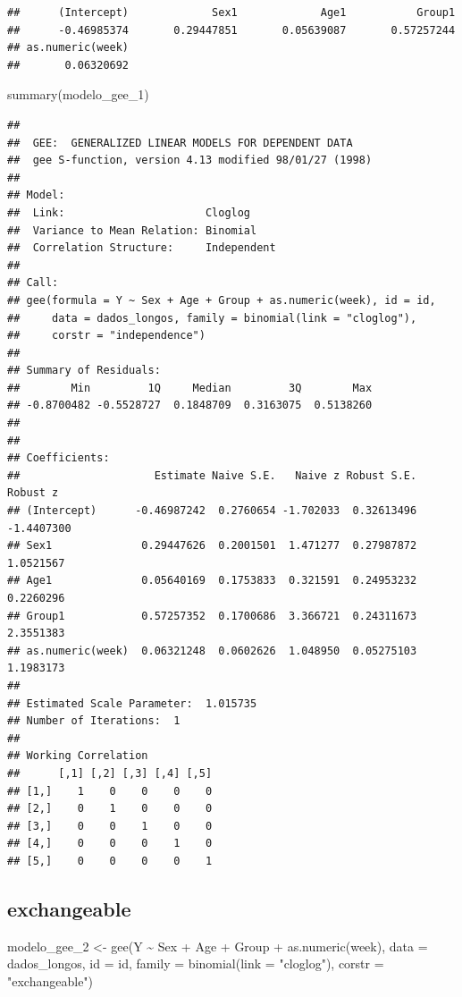\documentclass[
]{article}
\newenvironment{Shaded}{\begin{snugshade}}{\end{snugshade}}
\newcommand{\AttributeTok}[1]{\textcolor[rgb]{0.77,0.63,0.00}{#1}}
\newcommand{\FunctionTok}[1]{\textcolor[rgb]{0.00,0.00,0.00}{#1}}
\newcommand{\NormalTok}[1]{#1}
\newcommand{\OtherTok}[1]{\textcolor[rgb]{0.56,0.35,0.01}{#1}}
\newcommand{\SpecialCharTok}[1]{\textcolor[rgb]{0.00,0.00,0.00}{#1}}
\newcommand{\StringTok}[1]{\textcolor[rgb]{0.31,0.60,0.02}{#1}}
\begin{document}
\begin{verbatim}
##      (Intercept)             Sex1             Age1           Group1 
##      -0.46985374       0.29447851       0.05639087       0.57257244 
## as.numeric(week) 
##       0.06320692
\end{verbatim}

\begin{Shaded}
\begin{Highlighting}[]
\FunctionTok{summary}\NormalTok{(modelo\_gee\_1)}
\end{Highlighting}
\end{Shaded}

\begin{verbatim}
## 
##  GEE:  GENERALIZED LINEAR MODELS FOR DEPENDENT DATA
##  gee S-function, version 4.13 modified 98/01/27 (1998) 
## 
## Model:
##  Link:                      Cloglog 
##  Variance to Mean Relation: Binomial 
##  Correlation Structure:     Independent 
## 
## Call:
## gee(formula = Y ~ Sex + Age + Group + as.numeric(week), id = id, 
##     data = dados_longos, family = binomial(link = "cloglog"), 
##     corstr = "independence")
## 
## Summary of Residuals:
##        Min         1Q     Median         3Q        Max 
## -0.8700482 -0.5528727  0.1848709  0.3163075  0.5138260 
## 
## 
## Coefficients:
##                     Estimate Naive S.E.   Naive z Robust S.E.   Robust z
## (Intercept)      -0.46987242  0.2760654 -1.702033  0.32613496 -1.4407300
## Sex1              0.29447626  0.2001501  1.471277  0.27987872  1.0521567
## Age1              0.05640169  0.1753833  0.321591  0.24953232  0.2260296
## Group1            0.57257352  0.1700686  3.366721  0.24311673  2.3551383
## as.numeric(week)  0.06321248  0.0602626  1.048950  0.05275103  1.1983173
## 
## Estimated Scale Parameter:  1.015735
## Number of Iterations:  1
## 
## Working Correlation
##      [,1] [,2] [,3] [,4] [,5]
## [1,]    1    0    0    0    0
## [2,]    0    1    0    0    0
## [3,]    0    0    1    0    0
## [4,]    0    0    0    1    0
## [5,]    0    0    0    0    1
\end{verbatim}

\hypertarget{exchangeable}{%
\subsection{exchangeable}\label{exchangeable}}

\begin{Shaded}
\begin{Highlighting}[]
\NormalTok{modelo\_gee\_2 }\OtherTok{\textless{}{-}} \FunctionTok{gee}\NormalTok{(Y }\SpecialCharTok{\textasciitilde{}}\NormalTok{ Sex }\SpecialCharTok{+}\NormalTok{ Age }\SpecialCharTok{+}\NormalTok{ Group }\SpecialCharTok{+} \FunctionTok{as.numeric}\NormalTok{(week), }
               \AttributeTok{data =}\NormalTok{ dados\_longos, }
               \AttributeTok{id =}\NormalTok{ id, }
               \AttributeTok{family =} \FunctionTok{binomial}\NormalTok{(}\AttributeTok{link =} \StringTok{"cloglog"}\NormalTok{),}
               \AttributeTok{corstr =} \StringTok{"exchangeable"}\NormalTok{)}
\end{Highlighting}
\end{Shaded}
\end{document}
